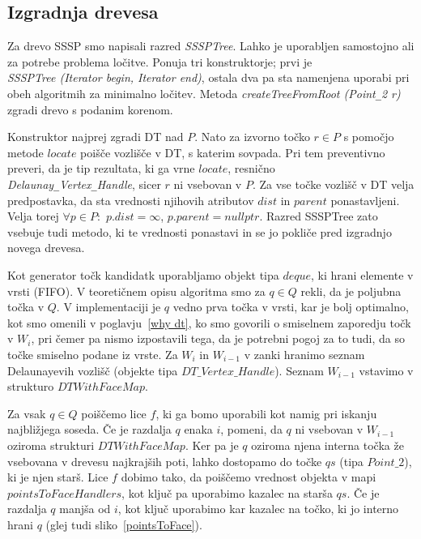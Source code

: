 \documentclass[a4paper, 12pt]{book}
\newcommand{\U}{\texttt{\_}}
\begin{document}
\subsection{Izgradnja drevesa} 

Za drevo SSSP smo napisali razred \textit{SSSPTree}. Lahko je uporabljen samostojno ali za potrebe problema ločitve. Ponuja tri konstruktorje; prvi je \\ \textit{SSSPTree (Iterator begin, Iterator end)}, ostala dva pa sta namenjena uporabi pri obeh algoritmih za minimalno ločitev. Metoda \textit{createTreeFromRoot (Point\U 2 r)} zgradi drevo s podanim korenom. 

Konstruktor najprej zgradi DT nad $P$. Nato za izvorno točko $r\in P$ s pomočjo metode $locate$ poišče vozlišče v DT, s katerim sovpada. Pri tem preventivno preveri, da je tip rezultata, ki ga vrne $locate$, resnično \\ 
\textit{Delaunay\U Vertex\U Handle}, sicer $r$ ni vsebovan v $P$. Za vse točke vozlišč v DT velja predpostavka, da sta vrednosti njihovih atributov $dist$ in $parent$ ponastavljeni. Velja torej $\forall p\in P:$ $p.dist = \infty$,  $p.parent = nullptr$. Razred SSSPTree zato vsebuje tudi metodo, ki te vrednosti ponastavi in se jo pokliče pred izgradnjo novega drevesa.

Kot generator točk kandidatk uporabljamo objekt tipa $deque$, ki hrani elemente v vrsti (FIFO). V teoretičnem opisu algoritma smo za $q\in Q$ rekli, da je poljubna točka v $Q$. V implementaciji je $q$ vedno prva točka v vrsti, kar je bolj optimalno, kot smo omenili v poglavju~\ref{why dt}, ko smo govorili o smiselnem zaporedju točk v $W_i$, pri čemer pa nismo izpostavili tega, da je potrebni pogoj za to tudi, da so točke smiselno podane iz vrste. Za $W_i$ in $W_{i-1}$ v zanki hranimo seznam Delaunayevih vozlišč (objekte tipa $DT\U Vertex\U Handle$). Seznam $W_{i-1}$ vstavimo v strukturo $DTWithFaceMap$. 

Za vsak $q\in Q$ poiščemo lice $f$, ki ga bomo uporabili kot namig pri iskanju najbližjega soseda. Če je razdalja $q$ enaka $i$, pomeni, da $q$ ni vsebovan v $W_{i-1}$ oziroma strukturi $DTWithFaceMap$. Ker pa je $q$ oziroma njena interna točka že vsebovana v drevesu najkrajših poti, lahko dostopamo do točke $qs$ (tipa $Point\U 2$), ki je njen starš.  Lice $f$ dobimo tako, da poiščemo vrednost objekta v mapi $pointsToFaceHandlers$, kot ključ pa uporabimo kazalec na starša $qs$. Če je razdalja $q$ manjša od $i$, kot ključ uporabimo kar kazalec na točko, ki jo interno hrani $q$ (glej tudi sliko~\ref{pointsToFace}).  
\end{document}
